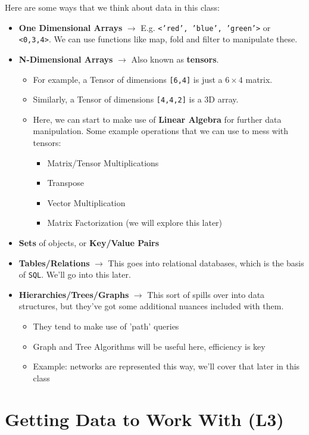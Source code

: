 \documentclass[english, 10pt]{article}
\begin{document}
Here are some ways that we think about data in this class:\newline

\begin{itemize}
	\item \textbf{One Dimensional Arrays} $\rightarrow$ E.g. \texttt{<'red', 'blue', 'green'>} or \texttt{<0,3,4>}. We can use functions like map, fold and filter to manipulate these.
	\item \textbf{N-Dimensional Arrays} $\rightarrow$ Also known as \textbf{tensors}.
	\begin{itemize}
		\item For example, a Tensor of dimensions \texttt{[6,4]} is just a $6\times 4$ matrix.
		\item Similarly, a Tensor of dimensions \texttt{[4,4,2]} is a 3D array.
		\item Here, we can start to make use of \textbf{Linear Algebra} for further data manipulation. Some example operations that we can use to mess with tensors:
		\begin{itemize}
			\item Matrix/Tensor Multiplications
			\item Transpose
			\item Vector Multiplication
			\item Matrix Factorization (we will explore this later)
		\end{itemize}
	\end{itemize}
	\item \textbf{Sets} of objects, or \textbf{Key/Value Pairs}
	\item \textbf{Tables/Relations} $\rightarrow$ This goes into relational databases, which is the basis of \texttt{SQL}. We'll go into this later.
	\item \textbf{Hierarchies/Trees/Graphs} $\rightarrow$ This sort of spills over into data structures, but they've got some additional nuances included with them.
	\begin{itemize}
		\item They tend to make use of 'path' queries
		\item Graph and Tree Algorithms will be useful here, efficiency is key
		\item Example: networks are represented this way, we'll cover that later in this class
	\end{itemize}
\end{itemize}

\section{Getting Data to Work With (L3)}
\end{document}
